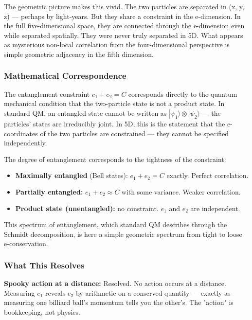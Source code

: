 \documentclass[aps,prd,preprint,superscriptaddress,longbibliography,floatfix]{revtex4-2}
\theoremstyle{remark}
\begin{document}
The geometric picture makes this vivid. The two particles are separated in (x, y, z) --- perhaps by light-years. But they share a constraint in the e-dimension. In the full five-dimensional space, they are connected through the e-dimension even while separated spatially. They were never truly separated in 5D. What appears as mysterious non-local correlation from the four-dimensional perspective is simple geometric adjacency in the fifth dimension.


\subsubsection{Mathematical Correspondence}

The entanglement constraint $e_{1} + e_{2} = C$ corresponds directly to the quantum mechanical condition that the two-particle state is not a product state. In standard QM, an entangled state cannot be written as $|\psi_{1}\rangle \otimes |\psi_{2}\rangle$ --- the particles' states are irreducibly joint. In 5D, this is the statement that the e-coordinates of the two particles are constrained --- they cannot be specified independently.

The degree of entanglement corresponds to the tightness of the constraint:


\begin{itemize}
  \item \textbf{Maximally entangled} (Bell states): $e_{1} + e_{2} = C$ exactly. Perfect correlation.
  \item \textbf{Partially entangled:} $e_{1} + e_{2} \approx C$ with some variance. Weaker correlation.
  \item \textbf{Product state (unentangled):} no constraint. $e_{1}$ and $e_{2}$ are independent.
\end{itemize}

This spectrum of entanglement, which standard QM describes through the Schmidt decomposition, is here a simple geometric spectrum from tight to loose e-conservation.


\subsubsection{What This Resolves}

\textbf{Spooky action at a distance:} Resolved. No action occurs at a distance. Measuring $e_{1}$ reveals $e_{2}$ by arithmetic on a conserved quantity --- exactly as measuring one billiard ball's momentum tells you the other's. The "action" is bookkeeping, not physics.
\end{document}
